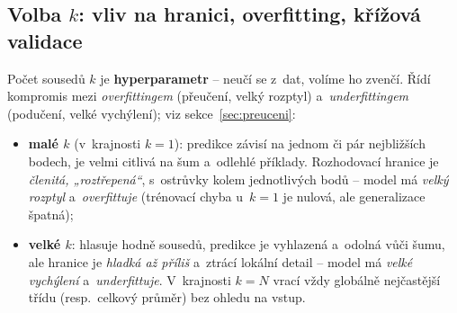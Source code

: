 \subsection{Volba $k$: vliv na hranici, overfitting, křížová validace}

Počet sousedů $k$ je \textbf{hyperparametr} -- neučí se z~dat, volíme ho zvenčí. Řídí kompromis mezi \emph{overfittingem} (přeučení, velký rozptyl) a~\emph{underfittingem} (podučení, velké vychýlení); viz sekce~\ref{sec:preuceni}:

\begin{itemize}
  \item \textbf{malé $k$} (v~krajnosti $k=1$): predikce závisí na jednom či pár nejbližších bodech, je velmi citlivá na šum a~odlehlé příklady. Rozhodovací hranice je \emph{členitá, „roztřepená``}, s~ostrůvky kolem jednotlivých bodů -- model má \emph{velký rozptyl} a~\emph{overfittuje} (trénovací chyba u~$k=1$ je nulová, ale generalizace špatná);
  \item \textbf{velké $k$}: hlasuje hodně sousedů, predikce je vyhlazená a~odolná vůči šumu, ale hranice je \emph{hladká až příliš} a~ztrácí lokální detail -- model má \emph{velké vychýlení} a~\emph{underfittuje}. V~krajnosti $k=N$ vrací vždy globálně nejčastější třídu (resp.\ celkový průměr) bez ohledu na vstup.
\end{itemize}

